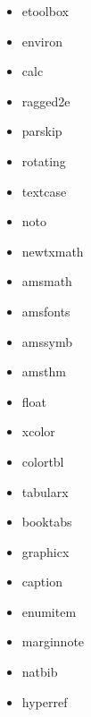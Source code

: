\documentclass{enisareport}
\theoremstyle{plain}
\theoremstyle{definition}
\begin{document}
\begin{multicols}{3}
\begin{itemize}
\item etoolbox
\item environ
\item calc
\item ragged2e
\item parskip
\item rotating
\item textcase
\item noto
\item newtxmath
\item amsmath
\item amsfonts
\item amssymb
\item amsthm
\item float
\item xcolor
\item colortbl
\item tabularx
\item booktabs
\item graphicx
\item caption
\item enumitem
\item marginnote
\item natbib
\item hyperref
\end{itemize}
\end{multicols}
\end{document}
